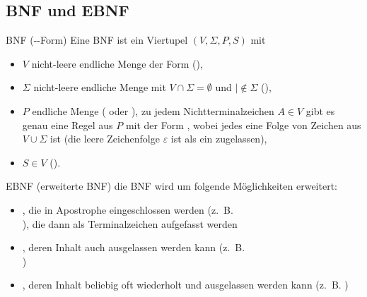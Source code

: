 \subsection{%
    BNF und EBNF%
}

\begin{Def}{BNF (--Form)}
    Eine BNF ist ein Viertupel $(V, \Sigma, P, S)$ mit
    \begin{itemize}
        \item $V$ nicht-leere endliche Menge der Form 
        (),

        \item $\Sigma$ nicht-leere endliche Menge mit
        $V \cap \Sigma = \emptyset$ und $| \notin \Sigma$
        (),

        \item $P$ endliche Menge ( oder
        ), zu jedem Nichtterminalzeichen $A \in V$ gibt
        es genau eine Regel aus $P$ mit der Form
        , wobei jedes  eine
        Folge von Zeichen aus $V \cup \Sigma$ ist
        (die leere Zeichenfolge $\varepsilon$ ist als ein 
        zugelassen),

        \item $S \in V$ ().
    \end{itemize}
\end{Def}

\begin{Def}{EBNF (erweiterte BNF)}
    die BNF wird um folgende Möglichkeiten erweitert:
    \begin{itemize}
        \item {}, die in Apostrophe
        eingeschlossen werden (z.~B. \\
        ), die dann als
        Terminalzeichen aufgefasst werden

        \item {}, deren Inhalt auch
        ausgelassen werden kann (z.~B. \\
        )

        \item {}, deren Inhalt
        beliebig oft wiederholt und ausgelassen werden kann (z.~B.
        )
    \end{itemize}
\end{Def}

